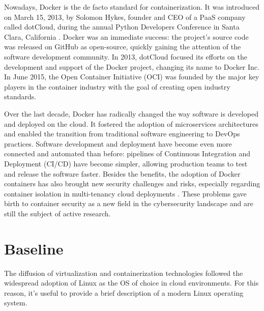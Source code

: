 Nowadays, Docker is the de facto standard for containerization. It was introduced on March 15, 2013, by Solomon Hykes, founder and CEO of a PaaS company called dotCloud, during the annual Python Developers Conference in Santa Clara, California \cite{hykesLightningTalkFuture2013}. Docker was an immediate success: the project's source code was released on GitHub as open-source, quickly gaining the attention of the software development community.
In 2013, dotCloud focused its efforts on the development and support of the Docker project, changing its name to Docker Inc. In June 2015, the Open Container Initiative (OCI) \cite{OpenContainerInitiative} was founded by the major key players in the container industry with the goal of creating open industry standards.

Over the last decade, Docker has radically changed the way software is developed and deployed on the cloud. It fostered the adoption of microservices architectures and enabled the transition from traditional software engineering to DevOps practices.
Software development and deployment have become even more connected and automated than before: pipelines of Continuous Integration and Deployment (CI/CD) have become simpler, allowing production teams to test and release the software faster. 
Besides the benefits, the adoption of Docker containers has also brought new security challenges and risks, especially regarding container isolation in multi-tenancy cloud deployments \cite{luo2016whispers,gao2018study}.
These problems gave birth to container security as a new field in the cybersecurity landscape and are still the subject of active research.

\section{Baseline}
The diffusion of virtualization and containerization technologies followed the widespread adoption of Linux as the OS of choice in cloud environments.
For this reason, it's useful to provide a brief description of a modern Linux operating system.

